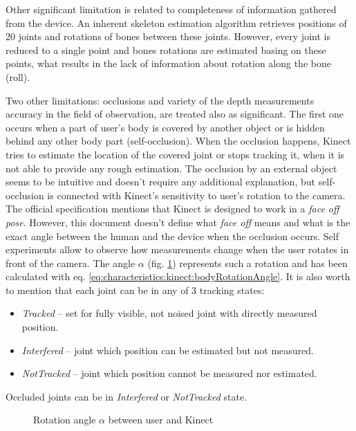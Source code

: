 \documentclass{llncs}
\begin{document}
Other significant limitation is related to completeness of information gathered from the device. An inherent skeleton estimation algorithm retrieves positions of 20 joints and rotations of bones between these joints. However, every joint is reduced to a single point and bones rotations are estimated basing on these points, what results in the lack of information about rotation along the bone (roll).

Two other limitations: occlusions and variety of the depth measurements accuracy in the field of observation, are treated also as significant. The first one occurs when a part of user's body is covered by another object or is hidden behind any other body part (self-occlusion). When the occlusion happens, Kinect tries to estimate the location of the covered joint or stops tracking it, when it is not able to provide any rough estimation. The occlusion by an external object seems to be intuitive and doesn't require any additional explanation, but self-occlusion is connected with Kinect's sensitivity to user's rotation to the camera. The official specification mentions that Kinect is designed to work in a \textit{face off pose}. However, this document doesn't define what \textit{face off} means and what is the exact angle between the human and the device when the occlusion occurs. Self experiments allow to observe how measurements change when the user rotates in front of the camera. The angle $\alpha$ (fig. \ref{fig:characteristics:kinect:bodyRotationAngle}) represents such a rotation and has been calculated with eq. \eqref{eq:characteristics:kinect:bodyRotationAngle}. It is also worth to mention that each joint can be in any of 3 tracking states:
\begin{itemize}
	\item \textsl{Tracked} -- set for fully visible, not noised joint with directly measured position.
	\item \textsl{Interfered} -- joint which position can be estimated but not measured.
	\item \textsl{NotTracked} -- joint which position cannot be measured nor estimated.
\end{itemize}

Occluded joints can be in \textsl{Interfered} or \textsl{NotTracked} state.

\begin{figure}[h!]		
	\centering
	\vspace{2.5cm}
	\caption{Rotation angle $\alpha$ between user and Kinect}
	\label{fig:characteristics:kinect:bodyRotationAngle}
\end{figure}	
\end{document}
